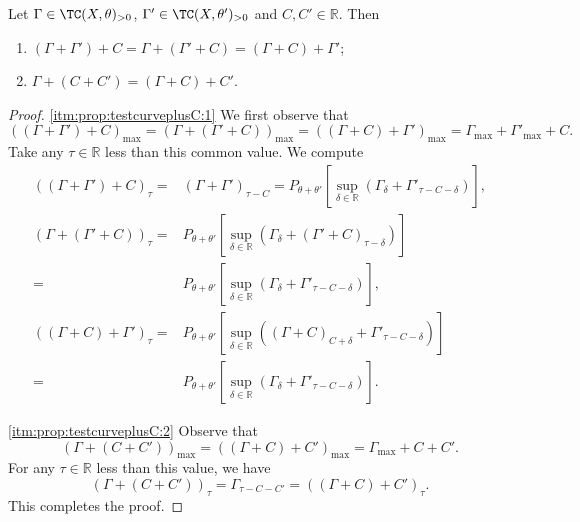 \begin{proposition}\label{prop:testcurveplusC}
    Let $\Gamma\in \TC(X,\theta)_{>0}$, $\Gamma'\in \TC(X,\theta')_{>0}$ and $C,C'\in \mathbb{R}$. Then
    \begin{enumerate}
        \item\label{itm:prop:testcurveplusC:1} $(\Gamma+\Gamma')+C=\Gamma+(\Gamma'+C)=(\Gamma+C)+\Gamma'$;
        \item\label{itm:prop:testcurveplusC:2} $\Gamma+(C+C')=(\Gamma+C)+C'$.
    \end{enumerate}
\end{proposition}
\begin{proof}
    \ref{itm:prop:testcurveplusC:1} We first observe that
    \[
    \left((\Gamma+\Gamma')+C\right)_{\max}=\left( \Gamma+(\Gamma'+C) \right)_{\max}=\left( (\Gamma+C)+\Gamma' \right)_{\max}=\Gamma_{\max}+\Gamma'_{\max}+C.
    \]
    Take any $\tau\in \mathbb{R}$ less than this common value. We compute
    \[
        \begin{aligned}
        \left((\Gamma+\Gamma')+C\right)_{\tau}=&(\Gamma+\Gamma')_{\tau-C}
        = P_{\theta+\theta'}\left[ \sup_{\delta\in \mathbb{R}}\left( \Gamma_\delta+\Gamma'_{\tau-C-\delta} \right) \right],\\
        \left( \Gamma+(\Gamma'+C) \right)_{\tau}=& P_{\theta+\theta'}\left[ \sup_{\delta\in \mathbb{R}}\left( \Gamma_\delta+(\Gamma'+C)_{\tau-\delta} \right) \right]\\
        =& P_{\theta+\theta'}\left[ \sup_{\delta\in \mathbb{R}}\left( \Gamma_\delta+\Gamma'_{\tau-C-\delta} \right) \right],\\
        \left((\Gamma+C)+\Gamma'\right)_{\tau}=& P_{\theta+\theta'}\left[ \sup_{\delta\in \mathbb{R}}\left( (\Gamma+C)_{C+\delta}+\Gamma'_{\tau-C-\delta} \right) \right]\\
        =& P_{\theta+\theta'}\left[ \sup_{\delta\in \mathbb{R}}\left( \Gamma_\delta+\Gamma'_{\tau-C-\delta} \right) \right].
        \end{aligned}
    \]

    \ref{itm:prop:testcurveplusC:2} Observe that
    \[
        \left( \Gamma+(C+C') \right)_{\max}=\left( (\Gamma+C)+C' \right)_{\max}=\Gamma_{\max}+C+C'.
    \]
    For any $\tau\in \mathbb{R}$ less than this value, we have
    \[
        \left( \Gamma+(C+C') \right)_{\tau}=\Gamma_{\tau-C-C'}=\left( (\Gamma+C)+C' \right)_{\tau}.
    \]
    This completes the proof.
\end{proof}

